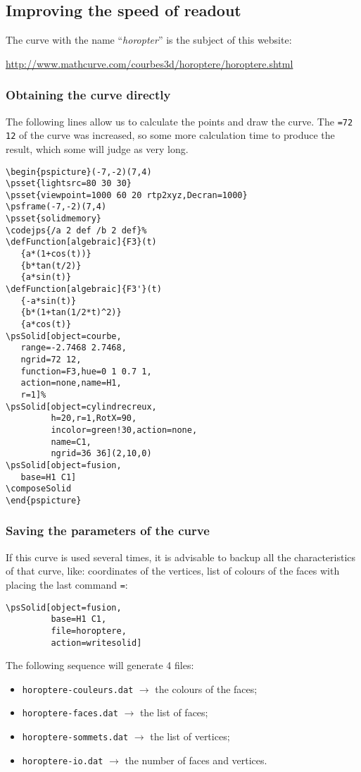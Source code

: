 \subsection{Improving the speed of readout}

The curve with the name ``\textit{horopter}'' is the subject of this website:

\centerline{\url{http://www.mathcurve.com/courbes3d/horoptere/horoptere.shtml}}

\subsubsection{Obtaining the curve directly}

The following lines allow us to calculate the points and draw  the curve.
The  \texttt{=72 12} of the curve was increased, so some
more calculation time to produce the result, which some will judge as very long.
\begin{verbatim}
\begin{pspicture}(-7,-2)(7,4)
\psset{lightsrc=80 30 30}
\psset{viewpoint=1000 60 20 rtp2xyz,Decran=1000}
\psframe(-7,-2)(7,4)
\psset{solidmemory}
\codejps{/a 2 def /b 2 def}%
\defFunction[algebraic]{F3}(t)
   {a*(1+cos(t))}
   {b*tan(t/2)}
   {a*sin(t)}
\defFunction[algebraic]{F3'}(t)
   {-a*sin(t)}
   {b*(1+tan(1/2*t)^2)}
   {a*cos(t)}
\psSolid[object=courbe,
   range=-2.7468 2.7468,
   ngrid=72 12,
   function=F3,hue=0 1 0.7 1,
   action=none,name=H1,
   r=1]%
\psSolid[object=cylindrecreux,
         h=20,r=1,RotX=90,
         incolor=green!30,action=none,
         name=C1,
         ngrid=36 36](2,10,0)
\psSolid[object=fusion,
   base=H1 C1]
\composeSolid
\end{pspicture}
\end{verbatim}

\subsubsection{Saving the parameters of the curve}

If this curve is used several times, it is advisable to backup all the
characteristics of that curve, like:
coordinates of the vertices, list of colours of the faces with placing
the last command \texttt{=}:
\begin{verbatim}
\psSolid[object=fusion,
         base=H1 C1,
         file=horoptere,
         action=writesolid]
\end{verbatim}
The following sequence  will generate 4 files:
\begin{itemize}
  \item \texttt{horoptere-couleurs.dat} $\rightarrow$ the colours of the faces;
  \item \texttt{horoptere-faces.dat} $\rightarrow$ the list of faces;
  \item \texttt{horoptere-sommets.dat} $\rightarrow$ the list of vertices;
  \item \texttt{horoptere-io.dat} $\rightarrow$ the number of faces and vertices.
\end{itemize}

